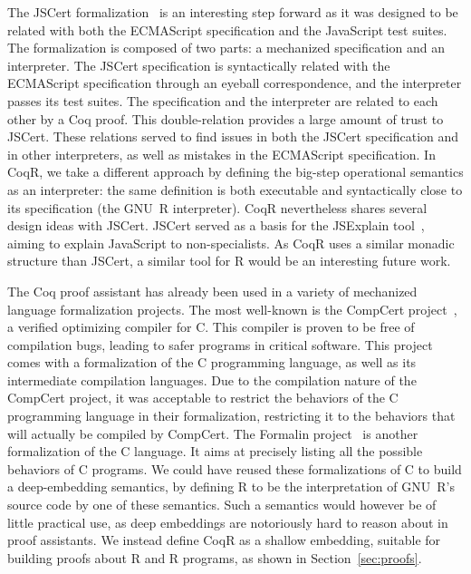 \documentclass[
    sigplan,
    10pt,
    review, %
    natbib=false %
 ]{acmart}
\newcommand\CoqR{CoqR}
\newcommand\newtext[1]{{\color{blue} #1}}
\begin{document}
The JSCert formalization~\parencite{popl14jscert}
is an interesting step forward as it was designed
to be related with both the ECMAScript specification and the JavaScript test suites.
The formalization is composed of two parts: a mechanized specification and an interpreter. The JSCert specification is syntactically related with the ECMAScript specification through an eyeball correspondence, and the interpreter passes its test suites.
The specification and the interpreter are related to each other by a Coq proof.
This double-relation provides a large amount of trust to JSCert.
These relations served to find issues in both the JSCert specification
and in other interpreters,
as well as mistakes in the ECMAScript specification.
In \CoqR, we take a different approach by defining the big-step operational semantics as an interpreter:
the same definition is both executable and syntactically close to its specification (the GNU~R interpreter).
\newtext{%
\CoqR{} nevertheless shares several design ideas with JSCert.
JSCert served as a basis for the JSExplain tool~\parencite{JSExplain},
aiming to explain JavaScript to non-specialists.
As \CoqR{} uses a similar monadic structure than JSCert,
a similar tool for R would be an interesting future work.}

The Coq proof assistant has already been used
in a variety of mechanized language formalization projects.
The most well-known is the CompCert project~\cite{Leroy-Compcert-CACM},
a verified optimizing compiler for C.
This compiler is proven to be free of compilation bugs,
leading to safer programs in critical software.
This project comes with a formalization of the C programming language,
as well as its intermediate compilation languages.
%
Due to the compilation nature of the CompCert project,
it was acceptable to restrict the behaviors of the C programming language
in their formalization,
restricting it to the behaviors that will actually be compiled by CompCert.
The Formalin project~\parencite{formalin} is another formalization
of the C language.
It aims at precisely listing all the possible behaviors of C programs.
%
\newtext{We could have reused these formalizations of C
to build a deep-embedding semantics,
by defining R to be the interpretation of GNU~R's source code by one of these semantics.
Such a semantics would however be of little practical use,
as deep embeddings are notoriously hard to reason about in proof assistants.
We instead define \CoqR{} as a shallow embedding, suitable for building proofs about R and R programs, as shown in Section~\ref{sec:proofs}.}
%
\end{document}
